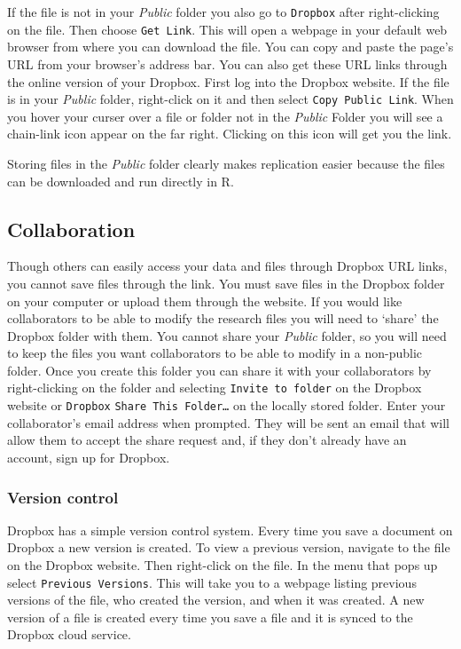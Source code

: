 If the file is not in your \emph{Public} folder you also go to \texttt{Dropbox} after right-clicking on the file. Then choose \texttt{Get Link}. This will open a webpage in your default web browser from where you can download the file. You can copy and paste the page's URL from your browser's address bar. You can also get these URL links through the online version of your Dropbox. First log into the Dropbox website. If the file is in your \emph{Public} folder, right-click on it and then select \texttt{Copy Public Link}. When you hover your curser over a file or folder not in the \emph{Public} Folder you will see a chain-link icon appear on the far right. Clicking on this icon will get you the link.

Storing files in the \emph{Public} folder clearly makes replication easier because the files can be downloaded and run directly in R.

\subsection{Collaboration}

Though others can easily access your data and files through Dropbox URL links, you cannot save files through the link. You must save files in the Dropbox folder on your computer or upload them through the website. If you would like collaborators to be able to modify the research files you will need to `share' the Dropbox folder with them. You cannot share your \emph{Public} folder, so you will need to keep the files you want collaborators to be able to modify in a non-public folder. Once you create this folder you can share it with your collaborators by right-clicking on the folder and selecting \texttt{Invite to folder} on the Dropbox website or \texttt{Dropbox} \textrightarrow\: \texttt{Share This Folder\ldots} on the locally stored folder. Enter your collaborator's email address when prompted. They will be sent an email that will allow them to accept the share request and, if they don't already have an account, sign up for Dropbox.

\subsubsection{Version control}

Dropbox has a simple version control system. Every time you save a document on Dropbox a new version is created. To view a previous version, navigate to the file on the Dropbox website. Then right-click on the file. In the menu that pops up select \texttt{Previous Versions}. This will take you to a webpage listing previous versions of the file, who created the version, and when it was created. A new version of a file is created every time you save a file and it is synced to the Dropbox cloud service. 

